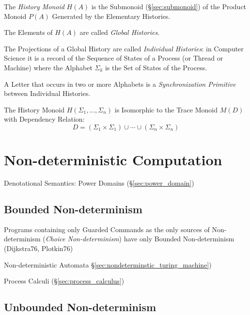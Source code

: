 The \emph{History Monoid} $H(A)$ is the Submonoid
(\S\ref{sec:submonoid}) of the Product Monoid $P(A)$ Generated by the
Elementary Histories.

The Elements of $H(A)$ are called \emph{Global Histories}.

The Projections of a Global History are called \emph{Individual
  Histories}: in Computer Science it is a record of the Sequence of
States of a Process (or Thread or Machine) where the Alphabet
$\Sigma_k$ is the Set of States of the Process.

A Letter that occurs in two or more Alphabets is a
\emph{Synchronization Primitive} between Individual Histories.

The History Monoid $H(\Sigma_1, \ldots, \Sigma_n)$ is Isomorphic to
the Trace Monoid $M(D)$ with Dependency Relation:
\[
  D = (\Sigma_1 \times \Sigma_1) \cup \cdots
    \cup (\Sigma_n \times \Sigma_n)
\]



\section{Non-deterministic Computation}
\label{sec:nondeterministic_computation}

Denotational Semantics: Power Domains (\S\ref{sec:power_domain})



\subsection{Bounded Non-determinism}\label{sec:bounded_nondeterminism}

Programs containing only Guarded Commands as the only sources of
Non-determinism (\emph{Choice Non-determinism}) have only Bounded
Non-determinism (Dijkstra76, Plotkin76)

\fist Non-deterministic Automata
\S\ref{sec:nondeterminstic_turing_machine})

\fist Process Calculi (\S\ref{sec:process_calculus})



\subsection{Unbounded Non-determinism}
\label{sec:unbounded_nondeterminism}


